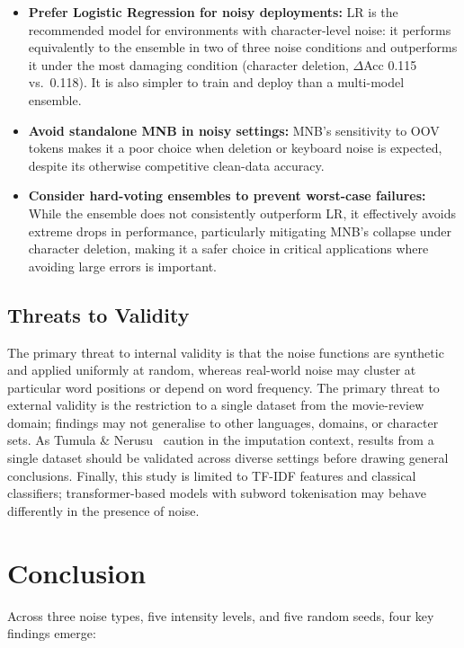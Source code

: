 \documentclass[sigconf]{acmart}
\begin{document}
\begin{itemize}
  \item \textbf{Prefer Logistic Regression for noisy deployments:} LR is the
    recommended model for environments with character-level noise: it performs
    equivalently to the ensemble in two of three noise conditions and
    outperforms it under the most damaging condition (character deletion,
    $\Delta$Acc 0.115 vs.\ 0.118). It is also simpler to train and deploy than
    a multi-model ensemble.
  \item \textbf{Avoid standalone MNB in noisy settings:} MNB's sensitivity to
    OOV tokens makes it a poor choice when deletion or keyboard noise is
    expected, despite its otherwise competitive clean-data accuracy.
  \item \textbf{Consider hard-voting ensembles to prevent worst-case failures:}
    While the ensemble does not consistently outperform LR, it effectively
    avoids extreme drops in performance, particularly mitigating MNB's collapse
    under character deletion, making it a safer choice in critical applications
    where avoiding large errors is important.
\end{itemize}

\subsection{Threats to Validity}
The primary threat to internal validity is that the noise functions are
synthetic and applied uniformly at random, whereas real-world noise may cluster
at particular word positions or depend on word frequency. The primary threat to
external validity is the restriction to a single dataset from the movie-review
domain; findings may not generalise to other languages, domains, or character
sets. As Tumula \& Nerusu~\cite{tumula2024} caution in the imputation context,
results from a single dataset should be validated across diverse settings
before drawing general conclusions. Finally, this study is limited to TF-IDF
features and classical classifiers; transformer-based models with subword
tokenisation may behave differently in the presence of noise.


\section{Conclusion}

Across three noise types, five intensity levels, and five random seeds, four
key findings emerge:
\end{document}
